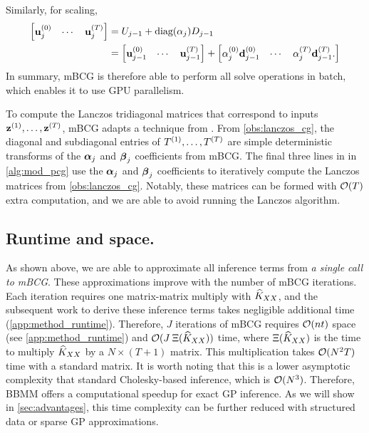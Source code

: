 %
Similarly, for scaling,
%
\begin{align*}
  \begin{bmatrix}
    \mathbf{u}_j^{(0)} & \cdots & \mathbf{u}_j^{(T)}
  \end{bmatrix}
  &=
  U_{j-1} + \text{diag}(\alpha_j) D_{j-1}
  \\
  &=
  \begin{bmatrix}
    \mathbf{u}_{j-1}^{(0)} & \cdots & \mathbf{u}_{j-1}^{(T)}
  \end{bmatrix}
  +
  \begin{bmatrix}
    \alpha_{j}^{(0)} \mathbf{d}_{j-1}^{(0)} & \cdots &  \alpha_{j}^{(T)} \mathbf{d}_{j-1}^{(T)}.
  \end{bmatrix}
\end{align*}
%
In summary, mBCG is therefore able to perform all solve operations in batch, which enables it to use GPU parallelism.

To compute the Lanczos tridiagonal matrices  that correspond to inputs $\mathbf{z}^{(1)}, \ldots, \mathbf{z}^{(T)}$, mBCG adapts a technique from \citet{saad2003iterative}.
From \cref{obs:lanczos_cg}, the diagonal and subdiagonal entries of $T^{(1)}, \ldots, T^{(T)}$ are simple deterministic transforms of the $\boldsymbol{\alpha}_j$ and $\boldsymbol{\beta}_j$ coefficients from mBCG.
The final three lines in {\color{\colornew} } in \cref{alg:mod_pcg} use the $\boldsymbol{\alpha}_j$ and $\boldsymbol{\beta}_j$ coefficients to iteratively compute the Lanczos matrices from \cref{obs:lanczos_cg}.
Notably, these matrices can be formed with $\bigo{T}$ extra computation, and we are able to avoid running the Lanczos algorithm.




\subsection{Runtime and space.}
As shown above, we are able to approximate all inference terms from \emph{a single call to mBCG}.
These approximations improve with the number of mBCG iterations.
Each iteration requires one matrix-matrix multiply with $\widehat{K}_{XX}$, and the subsequent work to derive these inference terms takes negligible additional time (\cref{app:method_runtime}).
Therefore, $J$ iterations of mBCG requires $\bigo{nt}$ space (see \cref{app:method_runtime}) and $\bigo{J \: \mmm{\trainK}}$ time,
where $\Xi (\widehat{K}_{XX})$ is the time to multiply $\widehat{K}_{XX}$ by a $N \times (T + 1)$ matrix.
This multiplication takes $\bigo{N^2 T}$ time with a standard matrix.
It is worth noting that this is a lower asymptotic complexity that standard Cholesky-based inference, which is $\bigo{N^3}$.
Therefore, BBMM offers a computational speedup for exact GP inference.
As we will show in \cref{sec:advantages}, this time complexity can be further reduced with structured data or sparse GP approximations.

